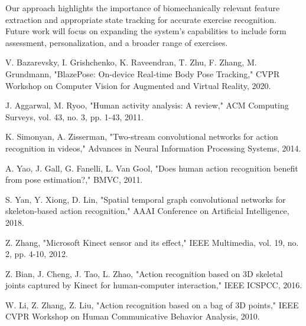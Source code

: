 \documentclass[conference]{IEEEtran}
\begin{document}
Our approach highlights the importance of biomechanically relevant feature extraction and appropriate state tracking for accurate exercise recognition. Future work will focus on expanding the system's capabilities to include form assessment, personalization, and a broader range of exercises.

\begin{thebibliography}{00}
 V. Bazarevsky, I. Grishchenko, K. Raveendran, T. Zhu, F. Zhang, M. Grundmann, "BlazePose: On-device Real-time Body Pose Tracking," CVPR Workshop on Computer Vision for Augmented and Virtual Reality, 2020.

 J. Aggarwal, M. Ryoo, "Human activity analysis: A review," ACM Computing Surveys, vol. 43, no. 3, pp. 1-43, 2011.

 K. Simonyan, A. Zisserman, "Two-stream convolutional networks for action recognition in videos," Advances in Neural Information Processing Systems, 2014.

 A. Yao, J. Gall, G. Fanelli, L. Van Gool, "Does human action recognition benefit from pose estimation?," BMVC, 2011.

 S. Yan, Y. Xiong, D. Lin, "Spatial temporal graph convolutional networks for skeleton-based action recognition," AAAI Conference on Artificial Intelligence, 2018.

 Z. Zhang, "Microsoft Kinect sensor and its effect," IEEE Multimedia, vol. 19, no. 2, pp. 4-10, 2012.

 Z. Bian, J. Cheng, J. Tao, L. Zhao, "Action recognition based on 3D skeletal joints captured by Kinect for human-computer interaction," IEEE ICSPCC, 2016.

 W. Li, Z. Zhang, Z. Liu, "Action recognition based on a bag of 3D points," IEEE CVPR Workshop on Human Communicative Behavior Analysis, 2010.
\end{thebibliography}
\end{document}
